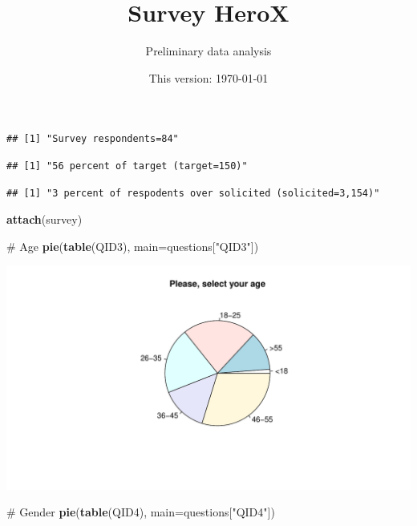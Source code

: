 \documentclass[12pt, titlepage]{article}
\institute{}
\title{Survey HeroX}
\author{Preliminary data analysis}
\date{This version: \today}
\newenvironment{Shaded}{\begin{snugshade}}{\end{snugshade}}
\newcommand{\KeywordTok}[1]{\textcolor[rgb]{0.12,0.11,0.11}{\textbf{#1}}}
\newcommand{\DataTypeTok}[1]{\textcolor[rgb]{0.00,0.34,0.68}{#1}}
\newcommand{\StringTok}[1]{\textcolor[rgb]{0.75,0.01,0.01}{#1}}
\newcommand{\CommentTok}[1]{\textcolor[rgb]{0.54,0.53,0.53}{#1}}
\newcommand{\NormalTok}[1]{\textcolor[rgb]{0.12,0.11,0.11}{#1}}
\begin{document}
\maketitle


\clearpage

\begin{verbatim}
## [1] "Survey respondents=84"
\end{verbatim}

\begin{verbatim}
## [1] "56 percent of target (target=150)"
\end{verbatim}

\begin{verbatim}
## [1] "3 percent of respodents over solicited (solicited=3,154)"
\end{verbatim}

\begin{Shaded}
\begin{Highlighting}[]
\KeywordTok{attach}\NormalTok{(survey)}

\CommentTok{# Age}
\KeywordTok{pie}\NormalTok{(}\KeywordTok{table}\NormalTok{(QID3), }\DataTypeTok{main=}\NormalTok{questions[}\StringTok{"QID3"}\NormalTok{])}
\end{Highlighting}
\end{Shaded}

\includegraphics{analysis_survey_files/figure-latex/unnamed-chunk-2-1.pdf}

\begin{Shaded}
\begin{Highlighting}[]
\CommentTok{# Gender}
\KeywordTok{pie}\NormalTok{(}\KeywordTok{table}\NormalTok{(QID4), }\DataTypeTok{main=}\NormalTok{questions[}\StringTok{"QID4"}\NormalTok{])}
\end{Highlighting}
\end{Shaded}
\end{document}
